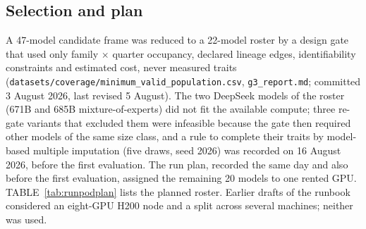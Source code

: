 \documentclass[10pt]{article}
\begin{document}
\subsection*{Selection and plan}
A 47-model candidate frame was reduced to a 22-model roster by a design gate that used only family $\times$ quarter occupancy, declared lineage edges, identifiability constraints and estimated cost, never measured traits (\texttt{datasets/coverage/minimum\_valid\_population.csv}, \texttt{g3\_report.md}; committed 3 August 2026, last revised 5 August). The two DeepSeek models of the roster (671B and 685B mixture-of-experts) did not fit the available compute; three re-gate variants that excluded them were infeasible because the gate then required other models of the same size class, and a rule to complete their traits by model-based multiple imputation (five draws, seed 2026) was recorded on 16 August 2026, before the first evaluation. The run plan, recorded the same day and also before the first evaluation, assigned the remaining 20 models to one rented GPU. TABLE~\ref{tab:runpodplan} lists the planned roster. Earlier drafts of the runbook considered an eight-GPU H200 node and a split across several machines; neither was used.

\begin{table}[H]
\caption{\textbf{Planned roster of the earlier per-model evaluation} (\texttt{datasets/coverage/trait\_definition.csv}). Size: as listed in the plan. Gated: the repository requires an accepted licence and a Hugging Face token.}
\label{tab:runpodplan}
\centering
\footnotesize
\setlength{\tabcolsep}{3pt}
\end{table}
\end{document}
